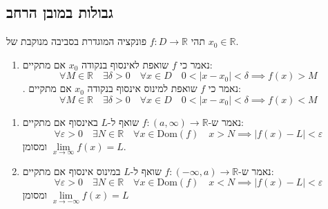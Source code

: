 \documentclass{tstextbook}
\begin{document}
\subsection{גבולות במובן הרחב}

\begin{definition}
תהי \(f:D\to \mathbb{R}\) פונקציה המוגדרת בסביבה מנוקבת של \(x_{0} \in \mathbb{R}\). 

  \begin{enumerate}
    \item נאמר כי \(f\) שואפת לאינסוף בנקודה \(x_{0}\) אם מתקיים: 
$$\forall M \in \mathbb{R}\quad \exists \delta > 0\quad  \forall x \in D\quad 0<\lvert x-x_{0} \rvert <\delta\implies f(x) > M$$
. נאמר כי \(f\) שואפת למינוס אינסוף בנקודה \(x_{0}\) אם מתקיים:
$$\forall M \in \mathbb{R}\quad \exists \delta > 0\quad  \forall x \in D\quad 0<\lvert x-x_{0} \rvert <\delta\implies f(x) < M$$
  \end{enumerate}
\end{definition}
\begin{definition}
  \begin{enumerate}
    \item נאמר ש-\(f:\left( a,\infty \right)\to \mathbb{R}\) שואף ל-\(L\) באינסוף אם מתקיים: 
$$\forall\varepsilon>0\quad \exists N \in \mathbb{R}\quad \forall x \in \mathrm{Dom}(f)\quad  x > N\implies \lvert f(x)-L \rvert <\varepsilon$$
ומסומן \(\underset{ x \to \infty }{\lim }f(x)=L\).


    \item נאמר ש-\(f:\left( -\infty,a \right)\to \mathbb{R}\) שואף ל-\(L\) במינוס אינסוף אם מתקיים: 
$$\forall\varepsilon>0\quad \exists N \in \mathbb{R}\quad \forall x \in \mathrm{Dom}(f)\quad  x < N\implies \lvert f(x)-L \rvert <\varepsilon$$
ומסומן \(\underset{ x \to -\infty }{\lim }f(x)=L\)


  \end{enumerate}
\end{definition}
\end{document}
